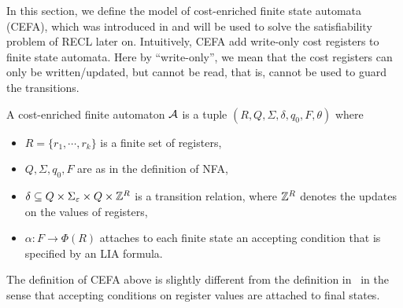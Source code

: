 %

In this section, we define the model of cost-enriched finite state automata (CEFA), which was introduced in \cite{atva2020} and will be used to solve the satisfiability problem of RECL later on. 
%
Intuitively, CEFA add write-only cost registers to finite state automata. Here by ``write-only'', we mean that the cost registers can only be written/updated, but cannot be read, that is, cannot be used to guard the transitions. 

%
\begin{definition}
  A cost-enriched finite automaton $\mathcal{A}$ is a tuple $(R, Q, \Sigma, \delta, q_0, F, \theta)$ where
  \begin{itemize}
  \item $R = \{r_1, \cdots, r_k\}$ is a finite set of registers, 
    \item $Q, \Sigma, q_0, F$ are as in the definition of NFA,
    \item $\delta \subseteq Q \times \Sigma_\varepsilon \times Q \times \mathbb{Z}^R$ is a transition relation, where $\mathbb{Z}^R$ denotes the updates on the values of registers, 
    \item $\alpha: F \rightarrow \Phi(R)$ attaches to each finite state an accepting condition that is specified by an LIA formula.
  \end{itemize}
\end{definition}
The definition of CEFA above is slightly different from the definition in~\cite{atva2020} in the sense that accepting conditions on register values
are attached to final states. 

